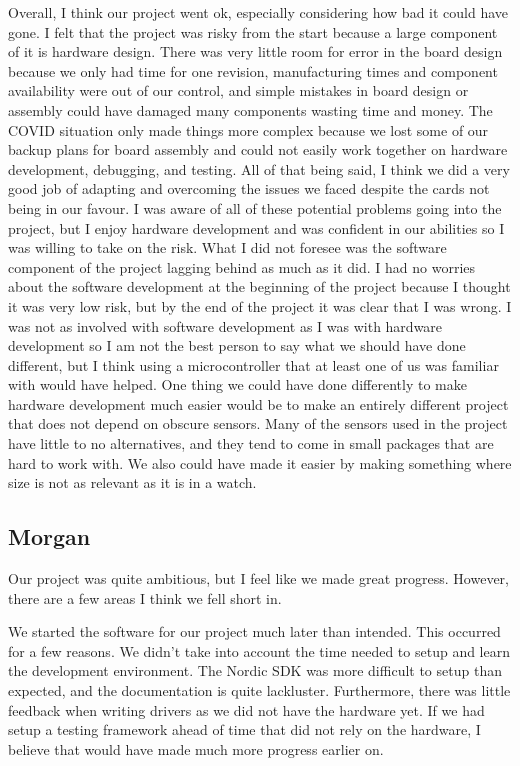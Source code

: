 Overall, I think our project went ok, especially considering how bad it could
have gone. I felt that the project was risky from the start because a large
component of it is hardware design. There was very little room for error in the
board design because we only had time for one revision, manufacturing times
and component availability were out of our control, and simple mistakes in board 
design or assembly could have damaged many components wasting time and money. 
The COVID situation only made things more complex because we lost some of our 
backup plans for board assembly and could not easily work together on hardware 
development, debugging, and testing. All of that being said, I think we did a 
very good job of adapting and overcoming the issues we faced despite the cards 
not being in our favour. I was aware of all of these potential problems going
into the project, but I enjoy hardware development and was confident in our 
abilities so I was willing to take on the risk. What I did not foresee was the
software component of the project lagging behind as much as it did. I had no
worries about the software development at the beginning of the project 
because I thought it was very low risk, but by the end of the project it was
clear that I was wrong. I was not as involved with software development as I was
with hardware development so I am not the best person to say what we should 
have done different, but I think using a microcontroller that at least one of us
was familiar with would have helped. One thing we could have done differently to 
make hardware development much easier would be to make an entirely different 
project that does not depend on obscure sensors. Many of the sensors used in the 
project have little to no alternatives, and they tend to come in small packages 
that are hard to work with. We also could have made it easier by making 
something where size is not as relevant as it is in a watch.

\subsection{Morgan}

Our project was quite ambitious, but I feel like we made great progress.
However, there are a few areas I think we fell short in.

We started the software for our project much later than intended.  This
occurred for a few reasons.  We didn't take into account the time needed to
setup and learn the development environment.  The Nordic SDK was more difficult
to setup than expected, and the documentation is quite lackluster.
Furthermore, there was little feedback when writing drivers as we did not have
the hardware yet.  If we had setup a testing framework ahead of time that did
not rely on the hardware, I believe that would have made much more progress
earlier on.

